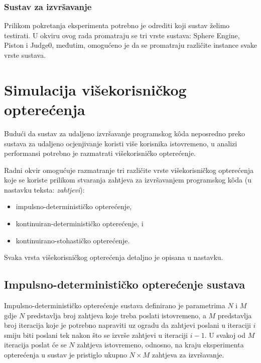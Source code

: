 \documentclass[times, utf8, diplomski]{fer}
\begin{document}
\subsubsection{Sustav za izvršavanje}
Prilikom pokretanja eksperimenta potrebno je odrediti koji sustav želimo testirati. U okviru ovog rada promatraju se tri vrste sustava: Sphere Engine, Piston i Judge0, međutim, omogućeno je da se promatraju različite instance svake vrste sustava.

\section{Simulacija višekorisničkog opterećenja}
Budući da sustav za udaljeno izvršavanje programskog kôda neposredno preko sustava za udaljeno ocjenjivanje koristi više korisnika istovremeno, u analizi performansi potrebno je razmatrati višekorisničko opterećenje.

Radni okvir omogućuje razmatranje tri različite vrste višekorisničkog opterećenja koje se koriste prilikom stvaranja zahtjeva za izvršavanjem programskog kôda (u nastavku teksta: \textit{zahtjevi}):
\begin{itemize}
    \item impulsno-determinističko opterećenje,
    \item kontinuiran-determinističko opterećenje, i
    \item kontinuirano-stohastičko opterećenje.
\end{itemize}

Svaka vrsta višekorisničkog opterećenja detaljno je opisana u nastavku.

\subsection{Impulsno-determinističko opterećenje sustava}
Impulsno-determinističko opterećenje sustava definirano je parametrima $N$ i $M$ gdje $N$ predstavlja broj zahtjeva koje treba poslati istovremeno, a $M$ predstavlja broj iteracija koje je potrebno napraviti uz ogradu da zahtjevi poslani u iteraciji $i$ smiju biti poslani tek nakon što se izvrše zahtjevi u iteraciji $i - 1$. U svakoj od $M$ iteracija poslat će se $N$ zahtjeva istovremeno, odnosno, na kraju eksperimenta opterećenja u sustav je pristiglo ukupno $N \times M$ zahtjeva za izvršavanje.
\end{document}
